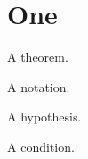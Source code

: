 \documentclass[EJP]{ejpecp}
\begin{document}
\section{One}
\begin{theorem}A theorem.\end{theorem}
\begin{notation}A notation.\end{notation}
\begin{hypothesis}A hypothesis.\end{hypothesis}
\begin{condition}A condition.\end{condition}
\end{document}
